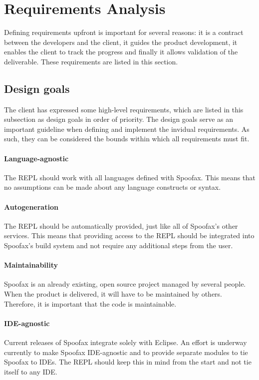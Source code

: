 \section{Requirements Analysis}
\label{sec:requirement-analysis}

Defining requirements upfront is important for several reasons: it is a contract
between the developers and the client, it guides the product development, it
enables the client to track the progress and finally it allows validation of the
deliverable. These requirements are listed in this section.

\subsection{Design goals}
\label{ssec:goals}

The client has expressed some high-level requirements, which are listed in this
subsection as design goals in order of priority. The design goals serve as an
important guideline when defining and implement the invidual requirements. As
such, they can be considered the bounds within which all requirements must fit.

\paragraph{Language-agnostic} The REPL should work with all languages
defined with Spoofax. This means that no assumptions can be made about any
language constructs or syntax.

\paragraph{Autogeneration} The REPL should be automatically provided, just like
all of Spoofax's other services. This means that providing access to the REPL
should be integrated into Spoofax's build system and not require any additional
steps from the user.

\paragraph{Maintainability} Spoofax is an already existing, open source project
managed by several people. When the product is delivered, it will have to be
maintained by others. Therefore, it is important that the code is maintainable.

\paragraph{IDE-agnostic} Current releases of Spoofax integrate solely with
Eclipse. An effort is underway currently to make Spoofax IDE-agnostic and to
provide separate modules to tie Spoofax to IDEs. The REPL should keep this in
mind from the start and not tie itself to any IDE.

